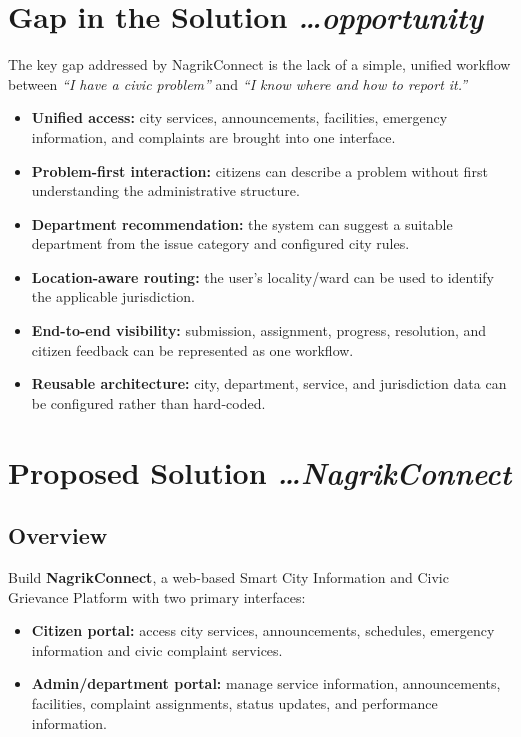 \documentclass[11pt,a4paper]{article}
\newcommand{\BvrHint}[1]{{\normalfont\normalsize\itshape\hfill #1}}
\begin{document}
\section{Gap in the Solution %
\BvrHint{\ldots opportunity}}
The key gap addressed by NagrikConnect is the lack of a simple, unified workflow between \emph{``I have a civic problem''} and \emph{``I know where and how to report it.''}

\begin{itemize}[leftmargin=0.7cm]
    \item \textbf{Unified access:} city services, announcements, facilities, emergency information, and complaints are brought into one interface.
    \item \textbf{Problem-first interaction:} citizens can describe a problem without first understanding the administrative structure.
    \item \textbf{Department recommendation:} the system can suggest a suitable department from the issue category and configured city rules.
    \item \textbf{Location-aware routing:} the user's locality/ward can be used to identify the applicable jurisdiction.
    \item \textbf{End-to-end visibility:} submission, assignment, progress, resolution, and citizen feedback can be represented as one workflow.
    \item \textbf{Reusable architecture:} city, department, service, and jurisdiction data can be configured rather than hard-coded.
\end{itemize}

\section{Proposed Solution %
\BvrHint{\ldots NagrikConnect}}
\subsection{Overview}
Build \textbf{NagrikConnect}, a web-based Smart City Information and Civic Grievance Platform with two primary interfaces:
\begin{itemize}[leftmargin=0.7cm]
    \item \textbf{Citizen portal:} access city services, announcements, schedules, emergency information and civic complaint services.
    \item \textbf{Admin/department portal:} manage service information, announcements, facilities, complaint assignments, status updates, and performance information.
\end{itemize}
\end{document}
